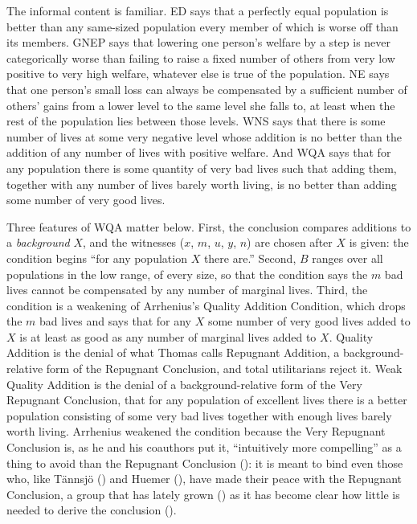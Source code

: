 \documentclass[
  11pt,
  letterpaper,
  DIV=11,
  numbers=noendperiod,
  twoside]{scrartcl}
\begin{document}
The informal content is familiar. ED says that a perfectly equal
population is better than any same-sized population every member of
which is worse off than its members. GNEP says that lowering one
person's welfare by a step is never categorically worse than failing to
raise a fixed number of others from very low positive to very high
welfare, whatever else is true of the population. NE says that one
person's small loss can always be compensated by a sufficient number of
others' gains from a lower level to the same level she falls to, at
least when the rest of the population lies between those levels. WNS
says that there is some number of lives at some very negative level
whose addition is no better than the addition of any number of lives
with positive welfare. And WQA says that for any population there is
some quantity of very bad lives such that adding them, together with any
number of lives barely worth living, is no better than adding some
number of very good lives.

Three features of WQA matter below. First, the conclusion compares
additions to a \emph{background} \(X\), and the witnesses (\(x\), \(m\),
\(u\), \(y\), \(n\)) are chosen after \(X\) is given: the condition
begins ``for any population \(X\) there are.'' Second, \(B\) ranges over
all populations in the low range, of every size, so that the condition
says the \(m\) bad lives cannot be compensated by any number of marginal
lives. Third, the condition is a weakening of Arrhenius's Quality
Addition Condition, which drops the \(m\) bad lives and says that for
any \(X\) some number of very good lives added to \(X\) is at least as
good as any number of marginal lives added to \(X\). Quality Addition is
the denial of what Thomas calls Repugnant Addition, a
background-relative form of the Repugnant Conclusion, and total
utilitarians reject it. Weak Quality Addition is the denial of a
background-relative form of the Very Repugnant Conclusion, that for any
population of excellent lives there is a better population consisting of
some very bad lives together with enough lives barely worth living.
Arrhenius weakened the condition because the Very Repugnant Conclusion
is, as he and his coauthors put it, ``intuitively more compelling'' as a
thing to avoid than the Repugnant Conclusion
(): it is meant to bind even those who, like Tännsjö
() and Huemer
(), have made their peace with the
Repugnant Conclusion, a group that has lately grown
() as it has become clear
how little is needed to derive the conclusion
().
\end{document}
